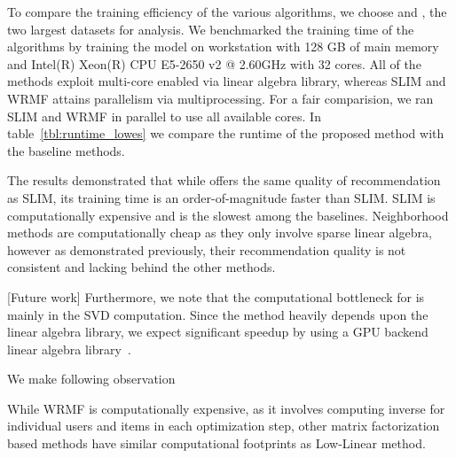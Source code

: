 To compare the training efficiency of the various algorithms, we choose \Lowes and \MLens, the two largest datasets for analysis.
We benchmarked the training time of the algorithms 
by training the model on  workstation with 128 GB of main memory and Intel(R) Xeon(R) CPU E5-2650 v2 @ 2.60GHz with 32 cores. All of the methods exploit multi-core enabled via linear algebra library, whereas SLIM and WRMF attains parallelism via multiprocessing. For a fair comparision, we ran  SLIM and WRMF in parallel to use all available cores.  In table~\ref{tbl:runtime_lowes} we compare the runtime of the proposed method with the baseline methods. 

The results demonstrated that while \LinearLow offers the same quality of recommendation as SLIM, its training time is an order-of-magnitude 
faster than SLIM.  SLIM is computationally expensive and is the slowest among the baselines. 
Neighborhood methods are computationally cheap as they only involve sparse linear algebra, however as demonstrated previously, their recommendation
quality is not consistent and lacking behind the other methods. 



[Future work] Furthermore, we note that the computational bottleneck for \LinearLow is mainly in the SVD computation. Since the method heavily depends upon the linear algebra library, we expect significant speedup by using a GPU backend linear algebra library~\citep{Voronin:GPURSVD}. 

We  make following observation
\begin{compactitem}
\item While WRMF is computationally expensive, as it involves computing inverse for individual users and items in each optimization step, other matrix factorization based methods have similar computational footprints as Low-Linear method.
\end{compactitem}

